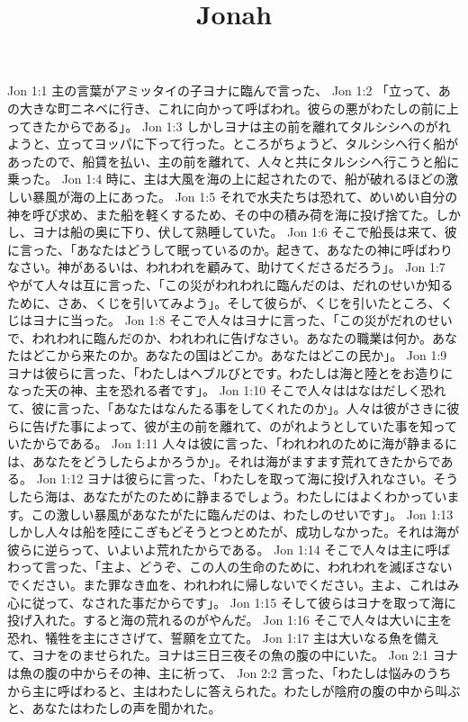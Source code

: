 

\title{Jonah}

Jon 1:1  主の言葉がアミッタイの子ヨナに臨んで言った、
Jon 1:2  「立って、あの大きな町ニネベに行き、これに向かって呼ばわれ。彼らの悪がわたしの前に上ってきたからである」。
Jon 1:3  しかしヨナは主の前を離れてタルシシへのがれようと、立ってヨッパに下って行った。ところがちょうど、タルシシへ行く船があったので、船賃を払い、主の前を離れて、人々と共にタルシシへ行こうと船に乗った。
Jon 1:4  時に、主は大風を海の上に起されたので、船が破れるほどの激しい暴風が海の上にあった。
Jon 1:5  それで水夫たちは恐れて、めいめい自分の神を呼び求め、また船を軽くするため、その中の積み荷を海に投げ捨てた。しかし、ヨナは船の奥に下り、伏して熟睡していた。
Jon 1:6  そこで船長は来て、彼に言った、「あなたはどうして眠っているのか。起きて、あなたの神に呼ばわりなさい。神があるいは、われわれを顧みて、助けてくださるだろう」。
Jon 1:7  やがて人々は互に言った、「この災がわれわれに臨んだのは、だれのせいか知るために、さあ、くじを引いてみよう」。そして彼らが、くじを引いたところ、くじはヨナに当った。
Jon 1:8  そこで人々はヨナに言った、「この災がだれのせいで、われわれに臨んだのか、われわれに告げなさい。あなたの職業は何か。あなたはどこから来たのか。あなたの国はどこか。あなたはどこの民か」。
Jon 1:9  ヨナは彼らに言った、「わたしはヘブルびとです。わたしは海と陸とをお造りになった天の神、主を恐れる者です」。
Jon 1:10  そこで人々ははなはだしく恐れて、彼に言った、「あなたはなんたる事をしてくれたのか」。人々は彼がさきに彼らに告げた事によって、彼が主の前を離れて、のがれようとしていた事を知っていたからである。
Jon 1:11  人々は彼に言った、「われわれのために海が静まるには、あなたをどうしたらよかろうか」。それは海がますます荒れてきたからである。
Jon 1:12  ヨナは彼らに言った、「わたしを取って海に投げ入れなさい。そうしたら海は、あなたがたのために静まるでしょう。わたしにはよくわかっています。この激しい暴風があなたがたに臨んだのは、わたしのせいです」。
Jon 1:13  しかし人々は船を陸にこぎもどそうとつとめたが、成功しなかった。それは海が彼らに逆らって、いよいよ荒れたからである。
Jon 1:14  そこで人々は主に呼ばわって言った、「主よ、どうぞ、この人の生命のために、われわれを滅ぼさないでください。また罪なき血を、われわれに帰しないでください。主よ、これはみ心に従って、なされた事だからです」。
Jon 1:15  そして彼らはヨナを取って海に投げ入れた。すると海の荒れるのがやんだ。
Jon 1:16  そこで人々は大いに主を恐れ、犠牲を主にささげて、誓願を立てた。
Jon 1:17  主は大いなる魚を備えて、ヨナをのませられた。ヨナは三日三夜その魚の腹の中にいた。
Jon 2:1  ヨナは魚の腹の中からその神、主に祈って、
Jon 2:2  言った、「わたしは悩みのうちから主に呼ばわると、主はわたしに答えられた。わたしが陰府の腹の中から叫ぶと、あなたはわたしの声を聞かれた。
